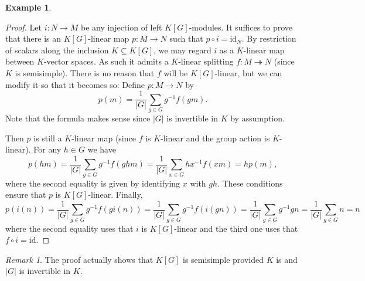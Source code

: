 \documentclass{amsart}[12pt]
\newcommand{\onto}{\twoheadrightarrow}
\newcommand{\id}{\mathrm{id}}
\numberwithin{equation}{section}
\theoremstyle{plain} %
\theoremstyle{definition}
\newtheorem{ex}[equation]{Example}
\theoremstyle{remark}
\newtheorem{rem}[equation]{Remark}
\begin{document}
\begin{ex}
        \begin{proof} Let $i: N \to M$ be any injection of left $K[G]$-modules. It suffices to prove that there is an $K[G]$-linear
map $p: M \to N$ such that $p \circ i = \id_N$. 
          By restriction of scalars along the inclusion $K \subseteq K[G]$, we may regard $i$ as a $K$-linear map between $K$-vector spaces. As such it admits a $K$-linear splitting
          $f: M \onto N$ (since $K$ is semisimple).  There is no reason that $f$ will be $K[G]$-linear, but we can modify it so that it becomes so: Define
          $p: M \to N$
          by
          $$
          p(m) = \frac{1}{|G|} \sum_{g \in G} g^{-1} f(g m).
          $$
          Note that the formula makes sense since $|G|$ is invertible in $K$ by assumption.
          
          Then $p$ is still a $K$-linear map (since $f$ is $K$-linear and the group action is $K$-linear). For any $h \in G$ we have 
          $$
          p(hm) = \frac{1}{|G|} \sum_{g \in G} g^{-1} f(g hm) = \frac{1}{|G|} \sum_{x \in G} hx^{-1} f(xm)
            = h p(m),
            $$
where the second equality is given by identifying $x$ with $gh$. 
            These conditions ensure that $p$ is $K[G]$-linear. Finally,
            $$
            p(i(n))= \frac{1}{|G|} \sum_{g \in G} g^{-1} f(g i(n))
            = \frac{1}{|G|} \sum_{g \in G} g^{-1} f(i(gn)) 
            = \frac{1}{|G|} \sum_{g \in G} g^{-1} gn
            = \frac{1}{|G|} \sum_{g \in G} n  = n
            $$
            where the second equality uses that $i$ is $K[G]$-linear
            and the third one  uses that $f \circ i =
            \id$.
          \end{proof}

          \begin{rem} The proof actually shows that $K[G]$ is semisimple provided $K$ is and $|G|$ is invertible in $K$.
            \end{rem}
            

\end{ex}
\end{document}
